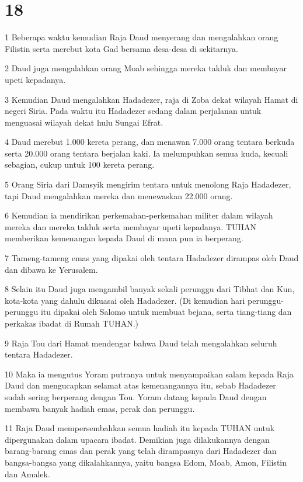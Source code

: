 \chapter{18}

\par 1 Beberapa waktu kemudian Raja Daud menyerang dan mengalahkan orang Filistin serta merebut kota Gad bersama desa-desa di sekitarnya.
\par 2 Daud juga mengalahkan orang Moab sehingga mereka takluk dan membayar upeti kepadanya.
\par 3 Kemudian Daud mengalahkan Hadadezer, raja di Zoba dekat wilayah Hamat di negeri Siria. Pada waktu itu Hadadezer sedang dalam perjalanan untuk menguasai wilayah dekat hulu Sungai Efrat.
\par 4 Daud merebut 1.000 kereta perang, dan menawan 7.000 orang tentara berkuda serta 20.000 orang tentara berjalan kaki. Ia melumpuhkan semua kuda, kecuali sebagian, cukup untuk 100 kereta perang.
\par 5 Orang Siria dari Damsyik mengirim tentara untuk menolong Raja Hadadezer, tapi Daud mengalahkan mereka dan menewaskan 22.000 orang.
\par 6 Kemudian ia mendirikan perkemahan-perkemahan militer dalam wilayah mereka dan mereka takluk serta membayar upeti kepadanya. TUHAN memberikan kemenangan kepada Daud di mana pun ia berperang.
\par 7 Tameng-tameng emas yang dipakai oleh tentara Hadadezer dirampas oleh Daud dan dibawa ke Yerusalem.
\par 8 Selain itu Daud juga mengambil banyak sekali perunggu dari Tibhat dan Kun, kota-kota yang dahulu dikuasai oleh Hadadezer. (Di kemudian hari perunggu-perunggu itu dipakai oleh Salomo untuk membuat bejana, serta tiang-tiang dan perkakas ibadat di Rumah TUHAN.)
\par 9 Raja Tou dari Hamat mendengar bahwa Daud telah mengalahkan seluruh tentara Hadadezer.
\par 10 Maka ia mengutus Yoram putranya untuk menyampaikan salam kepada Raja Daud dan mengucapkan selamat atas kemenangannya itu, sebab Hadadezer sudah sering berperang dengan Tou. Yoram datang kepada Daud dengan membawa banyak hadiah emas, perak dan perunggu.
\par 11 Raja Daud mempersembahkan semua hadiah itu kepada TUHAN untuk dipergunakan dalam upacara ibadat. Demikian juga dilakukannya dengan barang-barang emas dan perak yang telah dirampasnya dari Hadadezer dan bangsa-bangsa yang dikalahkannya, yaitu bangsa Edom, Moab, Amon, Filistin dan Amalek.
